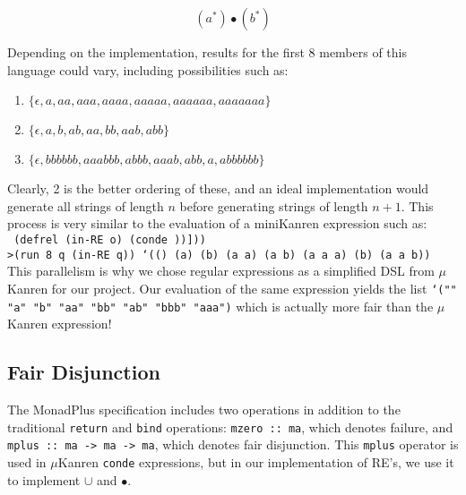 \documentclass[12pt]{article}
\begin{document}
$$(a^*) \bullet (b^*)$$

Depending on the implementation, results for the first 8 members of this language could vary, including possibilities such as:

\begin{enumerate}
  \item $\{\epsilon , a , aa , aaa , aaaa , aaaaa , aaaaaa, aaaaaaa \}$
  \item $\{\epsilon , a , b , ab , aa , bb , aab , abb \}$
  \item $\{\epsilon , bbbbbb , aaabbb , abbb , aaab , abb , a , abbbbbb \}$
\end{enumerate}
Clearly, 2 is the better ordering of these, and an ideal implementation would generate all strings of length $n$ before generating strings of length $n + 1$. This process is very similar to the evaluation of a miniKanren expression such as: \newline \\
\texttt{
(defrel (in-RE o) \newline
  \indent (conde \newline
  \indent \indent [(== o `())] \newline
  \indent \indent [(fresh (almost) \newline
  \indent \indent \indent (in-RE almost) \newline
  \indent \indent \indent (conde \newline
  \indent \indent \indent \indent [(== o `(a . ,almost))] \newline
  \indent \indent \indent {}))])) \newline \\
   >(run 8 q (in-RE q)) \newline
   `(() (a) (b) (a a) (a b) (a a a) (b) (a a b))
} \\

This parallelism is why we chose regular expressions as a simplified DSL from $\mu$Kanren for our project. Our evaluation of the same expression yields the list \texttt{`("" "a" "b" "aa" "bb" "ab" "bbb" "aaa")} which is actually  more fair than the $\mu$Kanren expression!

\subsection{Fair Disjunction}
The MonadPlus specification includes two operations in addition to the traditional \texttt{return} and \texttt{bind} operations: \texttt{mzero :: ma}, which denotes failure, and \texttt{mplus :: ma -> ma -> ma}, which denotes fair disjunction. This \texttt{mplus} operator is used in $\mu$Kanren \texttt{conde} expressions, but in our implementation of RE's, we use it to implement $\cup$ and $\bullet$.
\end{document}
